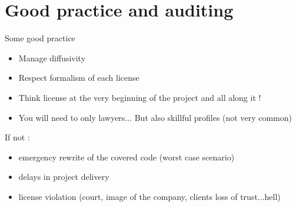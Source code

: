 \documentclass{beamer}
\begin{document}
\section{Good practice and auditing}

\begin{frame}{Some good practice}
  \begin{itemize}
  \item Manage diffusivity
  \item Respect formalism of each license
  \item Think license at the very beginning of the project and all along it !
  \item You will need to only lawyers... But also skillful profiles (not very common)
  \end{itemize}

If not :

\begin{itemize}
\item emergency rewrite of the covered code (worst case scenario)
\item delays in project delivery
\item license violation (court, image of the company, clients loss of trust...hell)
\end{itemize}
  
\end{frame}
\end{document}
